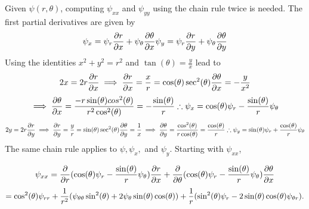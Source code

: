 \documentclass{article}
\begin{document}
Given $\psi (r,\theta)$, computing $\psi_{xx}$ and $\psi_{yy}$ using the chain rule twice is needed. The first partial derivatives are given by
\begin{equation*}
	\psi_{x}=\psi_{r} \frac{\partial r}{\partial x} +\psi_{\theta} \frac{\partial \theta}{\partial x} \newline \psi_{y}=\psi_{r} \frac{\partial r}{\partial y} +\psi_{\theta} \frac{\partial \theta}{\partial y}
\end{equation*}Using the identities $x^2 + y^2 = r^2$ and $\tan(\theta)=\frac{y}{x}$ lead to 
\begin{equation*}
2x=2r\frac{\partial r}{\partial x} \implies \frac{\partial r}{\partial x} = \frac{x}{r}=\cos(\theta) \newline \sec^2(\theta)\frac{\partial \theta}{\partial x} = -\frac{y}{x^2}\end{equation*}
\begin{equation*}
 \implies \frac{\partial \theta}{\partial x}=\frac{-r \sin(\theta)cos^2(\theta)}{r^2 \cos^2(\theta)} = -\frac{\sin(\theta)}{r} \newline \therefore \psi_{x}=\cos(\theta)\psi_{r}-\frac{\sin(\theta)}{r}\psi_{\theta}
\end{equation*}
\begin{equation*}\newline 2y=2r\frac{\partial r}{\partial y} \implies \frac{\partial r}{\partial y}=\frac{y}{r}=\sin(\theta) \newline \sec^2(\theta)\frac{\partial \theta}{\partial y} = \frac{1}{x} \implies \frac{\partial \theta}{\partial y}=\frac{\cos^2(\theta)}{r\cos(\theta)}=\frac{\cos(\theta)}{r} \newline \therefore \psi_{y}=\sin(\theta)\psi_{r}+\frac{\cos(\theta)}{r}\psi_{\theta}
\end{equation*}The same chain  rule applies to $\psi, \psi_x,$ and $\psi_y$. Starting with $\psi_{xx}$, 

\begin{equation*}
\psi_{xx}=\frac{\partial}{\partial r}(\cos(\theta)\psi_r -\frac{\sin(\theta)}{r}\psi_{\theta})\frac{\partial r}{\partial x} + \newline \frac{\partial}{\partial \theta}(\cos(\theta)\psi_r -\frac{\sin(\theta)}{r}\psi_{\theta})\frac{\partial \theta}{\partial x} 
\end{equation*}\begin{equation*}
=\cos^2(\theta)\psi_{rr}+\frac{1}{r^2}(\psi_{\theta \theta} \sin^2 (\theta)+2 \psi_{ \theta} \sin(\theta)\cos(\theta))\newline +\frac{1}{r}(\sin^2(\theta)\psi_r -2\sin(\theta)\cos(\theta)\psi_{\theta r}).
\end{equation*}
\end{document}
